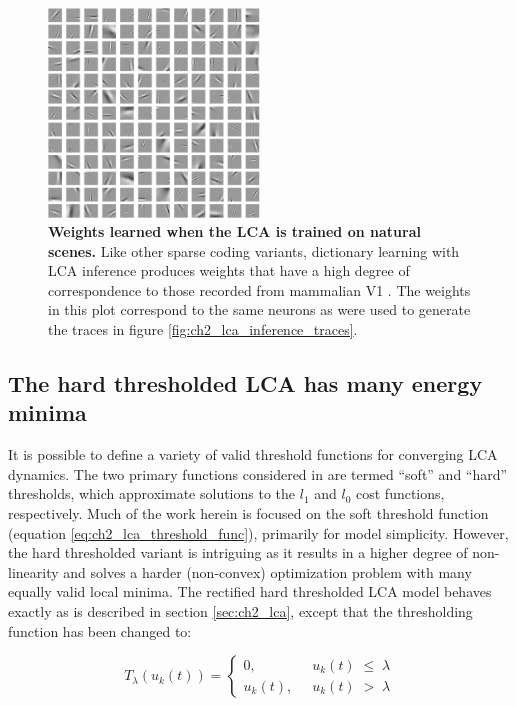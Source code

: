 \begin{figure}[h]
    \centering
    \includegraphics[width=0.5\textwidth]{figures/lca_inference_weights.png}
    \caption{\textbf{Weights learned when the LCA is trained on natural scenes.} Like other sparse coding variants, dictionary learning with LCA inference produces weights that have a high degree of correspondence to those recorded from mammalian V1 \parencite{zylberberg2011sparse, rehn2007network, olshausen1997sparse}. The weights in this plot correspond to the same neurons as were used to generate the traces in figure \ref{fig:ch2_lca_inference_traces}.}
    \label{fig:ch2_lca_inference_weights}
\end{figure}


\subsection{The hard thresholded LCA has many energy minima}\label{sec:ch2_hard_lca}
It is possible to define a variety of valid threshold functions for converging LCA dynamics. The two primary functions considered in \parencite{rozell2008sparse} are termed ``soft'' and ``hard'' thresholds, which approximate solutions to the $l_{1}$ and $l_{0}$ cost functions, respectively. Much of the work herein is focused on the soft threshold function (equation  \ref{eq:ch2_lca_threshold_func}), primarily for model simplicity. However, the hard thresholded variant is intriguing as it results in a higher degree of non-linearity and solves a harder (non-convex) optimization problem with many equally valid local minima. The rectified hard thresholded LCA model behaves exactly as is described in section \ref{sec:ch2_lca}, except that the thresholding function has been changed to:

\begin{equation}\label{eq:ch2_lca_hard_threshold_func}
    T_{\lambda}(u_{k}(t)) = \left\{
    \begin{aligned}
        0,\;\; &u_{k}(t)\; \leq\; \lambda \\
        u_{k}(t),\;\; &u_{k}(t)\; >\; \lambda
    \end{aligned}
    \right.
\end{equation}

